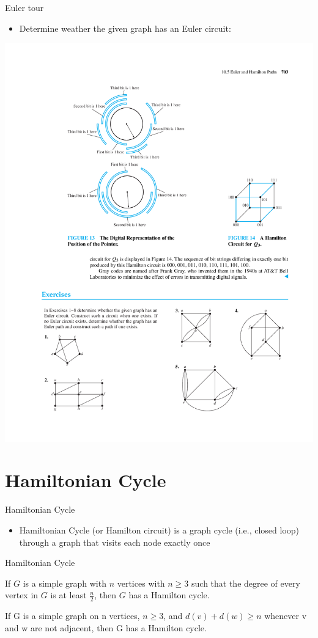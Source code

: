 \documentclass{beamer}
\theoremstyle{definition}
\begin{document}
\begin{frame}{Euler tour}
   \begin{itemize}
        \item Determine weather the given graph has an Euler circuit:
    \end{itemize}
    \centering \includegraphics[trim={12.2cm 2cm 5.2cm 22.2cm},clip,width=.45\linewidth]{p703}
\end{frame}

\section{Hamiltonian Cycle}

\begin{frame}{Hamiltonian Cycle}
   \begin{itemize}
        \item Hamiltonian Cycle (or Hamilton circuit) is a graph cycle (i.e., closed loop) through a graph that visits each node exactly once 
    \end{itemize}
\end{frame}

\begin{frame}{Hamiltonian Cycle}
    \begin{theorem}\label{theo:dirac}
        If $G$ is a simple graph with $n$ vertices with $n\geq 3$ such that the degree of every vertex in $G$ is at least $\frac{n}{2}$, then $G$ has a Hamilton cycle. 
    \end{theorem}
    \begin{theorem}\label{theo:ore}
        If G is a simple graph on n vertices, $n\geq 3$, and $d(v)+d(w)\geq n$ whenever v and w are not adjacent, then G has a Hamilton cycle. 
    \end{theorem}
\end{frame}
\end{document}
